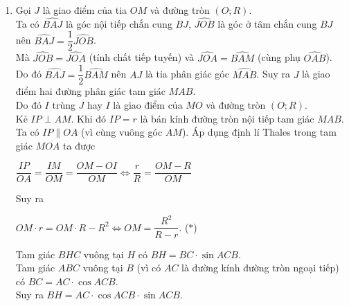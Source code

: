 \begin{bt}[3,0 điểm]
{\begin{enumerate}[1.]
                  Vì $BH$ và $AD$ cùng vuông góc $AC$ nên $BH \parallel AD$.\\
                  Áp dụng định lí Thales trong tam giác $CAM$ ta được $\dfrac{HK}{AM}=\dfrac{CK}{CM}$.\\
                  Áp dụng định lí Thales trong tam giác $CDM$ ta được $\dfrac{BK}{DM}=\dfrac{CK}{CM}$.\\
                  Suy ra $\dfrac{HK}{AM}=\dfrac{BK}{DM}\left( =\dfrac{CK}{CM} \right) $.\\
                  Mà $AM=DM$ nên $HK=BK$. Do vậy $K$ là trung điểm $BH$.
            \item Gọi $J$ là giao điểm của tia $OM$ và đường tròn $(O;R)$.\\
                  Ta có $\widehat{BAJ}$ là góc nội tiếp chắn cung $BJ$, $\widehat{JOB}$ là góc ở tâm chắn cung $BJ$ nên $\widehat{BAJ}=\dfrac12 \widehat{JOB}$.\\
                  Mà $\widehat{JOB}=\widehat{JOA}$ (tính chất tiếp tuyến) và $\widehat{JOA}=\widehat{BAM}$ (cùng phụ $\widehat{OAB}$).\\
                  Do đó $\widehat{BAJ}=\dfrac12 \widehat{BAM}$ nên $AJ$ là tia phân giác góc $\widehat{MAB}$. Suy ra $J$ là giao điểm hai đường phân giác tam giác $MAB$.\\
                  Do đó $I$ trùng $J$ hay $I$ là giao điểm của $MO$ và đường tròn $(O;R)$.\\
                  Kẻ $IP \perp AM$. Khi đó $IP=r$ là bán kính đường tròn nội tiếp tam giác $MAB$.\\
                  Ta có $IP \parallel OA$ (vì cùng vuông góc $AM$). Áp dụng định lí Thales trong tam giác $MOA$ ta được
                  \begin{center}
                    $\dfrac{IP}{OA}=\dfrac{IM}{OM}=\dfrac{OM-OI}{OM} \Leftrightarrow \dfrac{r}{R}=\dfrac{OM-R}{OM}$
                  \end{center}
                  Suy ra 
                  \begin{center}
                    $OM \cdot r = OM \cdot R - R^2 \Leftrightarrow OM = \dfrac{R^2}{R-r}$. \quad ($*$)
                  \end{center}
                  Tam giác $BHC$ vuông tại $H$ có $BH=BC \cdot \sin ACB$.\\
                  Tam giác $ABC$ vuông tại $B$ (vì có $AC$ là đường kính đường tròn ngoại tiếp) có $BC=AC \cdot \cos ACB $.\\
                  Suy ra $BH=AC \cdot \cos ACB \cdot \sin ACB$.\\

\end{enumerate}}
\end{bt}

